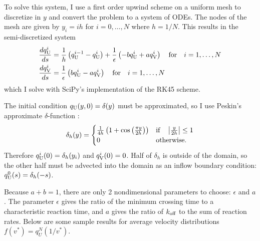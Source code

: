 \documentclass{article}
\newcommand{\tn}{\textnormal}
\newcommand{\dd}{d}
\newcommand{\Der}[2]{\frac{\dd #1}{\dd #2}}
\begin{document}
To solve this system, I use a first order upwind scheme on a uniform
mesh to discretize in $y$ and convert the problem to a system of
ODEs. The nodes of the mesh are given by $y_i = ih$ for $i = 0,
\hdots, N$ where $h = 1/N$. This results in the semi-discretized
system
\begin{align}
  \Der{q_\tn{U}^i}{s} &= \frac{1}{h} \left(q_\tn{U}^{i-1} - q_\tn{U}^i
                        \right) + \frac{1}{\epsilon} \left(-b
                        q_\tn{U}^i + a q_\tn{V}^i \right) \quad
                        \tn{for} \quad i = 1, \hdots, N
  \\
  \Der{q_\tn{V}^i}{s} &= \frac{1}{\epsilon} \left(b q_\tn{U}^i - a
                        q_\tn{V}^i \right) \quad \tn{for} \quad i = 1,
                        \hdots, N
\end{align}
which I solve with SciPy's implementation of the RK45 scheme.

The initial condition $q_\tn{U}(y, 0) = \delta(y)$ must be
approximated, so I use Peskin's approximate $\delta$-function
\cite{Peskin2002}:
\begin{equation}
  \label{eq:delta-h}
  \delta_h(y) =
  \begin{cases}
    \frac{1}{4h} \left( 1 + \cos\left(\frac{\pi y}{2h}\right) \right)
    & \tn{if} \quad \left|\frac{y}{2h}\right| \le 1 \\
    0 & \tn{otherwise.}
  \end{cases}
\end{equation}
Therefore $q_\tn{U}^i(0) = \delta_h(y_i)$ and $q_\tn{V}^i(0) =
0$. Half of $\delta_h$ is outside of the domain, so the other half
must be advected into the domain as an inflow boundary condition:
$q_\tn{U}^0(s) = \delta_h(-s)$.

Because $a + b = 1$, there are only 2 nondimensional parameters to
choose: $\epsilon$ and $a$. The parameter $\epsilon$ gives the ratio
of the minimum crossing time to a characteristic reaction time, and
$a$ gives the ratio of $k_\tn{off}$ to the sum of reaction
rates. Below are some sample results for average velocity
distributions $f(v^*) = q_U^N(1/v^*)$. 
\end{document}
